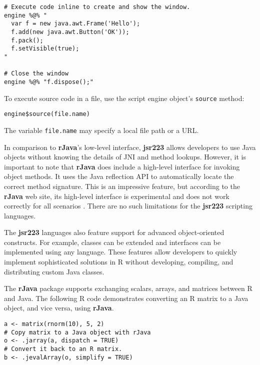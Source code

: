 \singlespace
\begin{verbatim}
# Execute code inline to create and show the window.
engine %@% "
  var f = new java.awt.Frame('Hello');
  f.add(new java.awt.Button('OK'));
  f.pack();
  f.setVisible(true);
"

# Close the window
engine %@% "f.dispose();"
\end{verbatim}
\doublespace
To execute source code in a file, use the script engine object's \texttt{source} method:
\begin{verbatim}
engine$source(file.name)
\end{verbatim}
The variable \texttt{file.name} may specify a local file path or a URL. %

In comparison to \textbf{rJava}'s low-level interface, \textbf{jsr223} allows developers to use Java objects without knowing the details of JNI and method lookups. However, it is important to note that \textbf{rJava} does include a high-level interface for invoking object methods. It uses the Java reflection API to automatically locate the correct method signature. This is an impressive feature, but according to the \textbf{rJava} web site, its high-level interface is experimental and does not work correctly for all scenarios \citep{rjavaweb}. There are no such limitations for the \textbf{jsr223} scripting languages.

The \textbf{jsr223} languages also feature support for advanced object-oriented constructs. For example, classes can be extended and interfaces can be implemented using any language. These features allow developers to quickly implement sophisticated solutions in R without developing, compiling, and distributing custom Java classes.

The \textbf{rJava} package supports exchanging scalars, arrays, and matrices between R and Java. The following R code demonstrates converting an R matrix to a Java object, and vice versa, using \textbf{rJava}.

\singlespace
\begin{verbatim}
a <- matrix(rnorm(10), 5, 2)
# Copy matrix to a Java object with rJava
o <- .jarray(a, dispatch = TRUE)
# Convert it back to an R matrix.
b <- .jevalArray(o, simplify = TRUE)
\end{verbatim}
\doublespace

